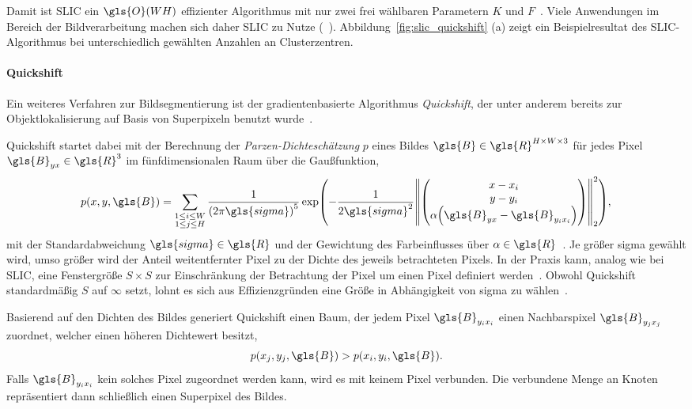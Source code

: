Damit ist \gls{SLIC} ein $\gls{O}\left(WH\right)$ effizienter Algorithmus mit nur zwei frei wählbaren Parametern $K$ und $F$~\cite{slic}.
Viele Anwendungen im Bereich der Bildverarbeitung machen sich daher \gls{SLIC} zu Nutze (\vgl{}~\cite{Gadde, supercnn, super}).
Abbildung~\ref{fig:slic_quickshift} (a) zeigt ein Beispielresultat des \gls{SLIC}-Algorithmus bei unterschiedlich gewählten Anzahlen an Clusterzentren.



\paragraph{Quickshift}
\label{quickshift}

Ein weiteres Verfahren zur Bildsegmentierung ist der gradientenbasierte Algorithmus \emph{Quickshift}, der unter anderem bereits zur Objektlokalisierung auf Basis von Superpixeln benutzt wurde~\cite{quickshift,Fulkerson}.

Quickshift startet dabei mit der Berechnung der \emph{Parzen-Dichteschätzung} $p$ eines Bildes $\gls{B} \in \gls{R}^{H \times W \times 3}$ für jedes Pixel $\gls{B}_{yx} \in \gls{R}^3$ im fünfdimensionalen Raum über die Gaußfunktion, \dhe{}
\begin{equation*}
  p\left(x,y, \gls{B}\right) = \sum_{\substack{1 \leq i \leq W\\1 \leq j \leq H}}
  \frac{1}{{\left(2\pi\gls{sigma}\right)}^5} \exp\left(-\frac{1}{2\gls{sigma}^2}{\left\|\begin{pmatrix}
    x - x_i\\
    y - y_i\\
    \alpha \left(\gls{B}_{yx} - \gls{B}_{y_i x_i}\right)
  \end{pmatrix}\right\|}_2^2\right),
\end{equation*}
mit der Standardabweichung $\gls{sigma} \in \gls{R}$ und der Gewichtung des Farbeinflusses über $\alpha \in \gls{R}$~\cite{quickshift}.
Je größer \gls{sigma} gewählt wird, umso größer wird der Anteil weitentfernter Pixel zu der Dichte des jeweils betrachteten Pixels.
In der Praxis kann, analog wie bei \gls{SLIC}, eine Fenstergröße $S \times S$ zur Einschränkung der Betrachtung der Pixel um einen Pixel definiert werden~\cite{super}.
Obwohl Quickshift standardmäßig $S$ auf $\infty$ setzt, lohnt es sich aus Effizienzgründen eine Größe in Abhängigkeit von \gls{sigma} zu wählen~\cite{quickshift}.

Basierend auf den Dichten des Bildes generiert Quickshift einen Baum, der jedem Pixel $\gls{B}_{y_i x_i}$ einen Nachbarspixel $\gls{B}_{y_j x_j}$ zuordnet, welcher einen höheren Dichtewert besitzt, \dhe{}
\begin{equation*}
  p\left(x_j, y_j, \gls{B}\right) > p\left(x_i, y_i, \gls{B}\right).
\end{equation*}
Falls $\gls{B}_{y_i x_i}$ kein solches Pixel zugeordnet werden kann, wird es mit keinem Pixel verbunden.
Die verbundene Menge an Knoten repräsentiert dann schließlich einen Superpixel des Bildes.


